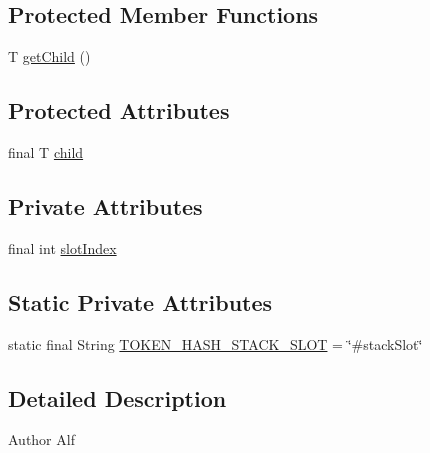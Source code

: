 \subsection*{Protected Member Functions}
\begin{DoxyCompactItemize}
\item 
T \hyperlink{classgov_1_1nasa_1_1jpf_1_1inspector_1_1server_1_1expression_1_1_expression_state_unary_operator_a150bac338d6557f79ca185d3f6ad6e06}{get\+Child} ()
\end{DoxyCompactItemize}
\subsection*{Protected Attributes}
\begin{DoxyCompactItemize}
\item 
final T \hyperlink{classgov_1_1nasa_1_1jpf_1_1inspector_1_1server_1_1expression_1_1_expression_state_unary_operator_a66041b1f569a361549e28a00f7ca5f2f}{child}
\end{DoxyCompactItemize}
\subsection*{Private Attributes}
\begin{DoxyCompactItemize}
\item 
final int \hyperlink{classgov_1_1nasa_1_1jpf_1_1inspector_1_1server_1_1expression_1_1expressions_1_1_expression_state_stack_frame_slot_ad943f10c022780efc661c1b961fdfd77}{slot\+Index}
\end{DoxyCompactItemize}
\subsection*{Static Private Attributes}
\begin{DoxyCompactItemize}
\item 
static final String \hyperlink{classgov_1_1nasa_1_1jpf_1_1inspector_1_1server_1_1expression_1_1expressions_1_1_expression_state_stack_frame_slot_a5f4dc5485fda075425d02640fab49c26}{T\+O\+K\+E\+N\+\_\+\+H\+A\+S\+H\+\_\+\+S\+T\+A\+C\+K\+\_\+\+S\+L\+OT} = \char`\"{}\#stack\+Slot\char`\"{}
\end{DoxyCompactItemize}


\subsection{Detailed Description}
\begin{DoxyAuthor}{Author}
Alf 
\end{DoxyAuthor}


